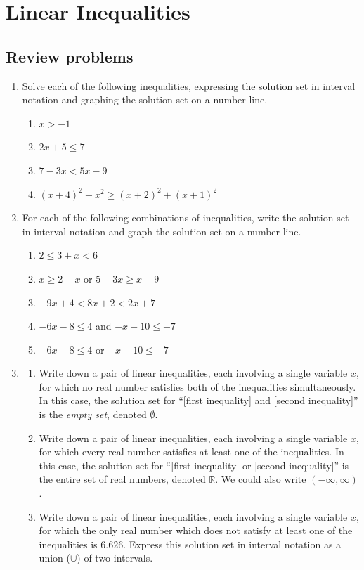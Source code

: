 \section{Linear Inequalities}

\subsection{Review problems}

\begin{enumerate}
\item Solve each of the following inequalities, expressing the solution set in interval notation and graphing the solution set on a number line.
\begin{enumerate}
\item $x > -1$
\item $2x + 5\leq 7$
\item $7 - 3x < 5x - 9$
\item $(x + 4)^2 + x^2\geq (x + 2)^2 + (x + 1)^2$
\end{enumerate}
\item For each of the following combinations of inequalities, write the solution set in interval notation and graph the solution set on a number line.
\begin{enumerate}
\item $2\leq 3 + x < 6$
\item $x\geq 2 - x$ or $5 - 3x\geq x + 9$
\item $-9x + 4 < 8x + 2 < 2x + 7$
\item $-6x - 8\leq 4$ and $-x - 10\leq -7$
\item $-6x - 8\leq 4$ or $-x - 10\leq -7$
\end{enumerate}
\item \begin{enumerate}
\item Write down a pair of linear inequalities, each involving a single variable $x$, for which no real number satisfies both of the inequalities simultaneously. In this case, the solution set for ``[first inequality] and [second inequality]'' is the \emph{empty set}, denoted $\emptyset$.
\item Write down a pair of linear inequalities, each involving a single variable $x$, for which every real number satisfies at least one of the inequalities. In this case, the solution set for ``[first inequality] or [second inequality]'' is the entire set of real numbers, denoted $\mathbb{R}$. We could also write $(-\infty, \infty)$.
\item Write down a pair of linear inequalities, each involving a single variable $x$, for which the only real number which does not satisfy at least one of the inequalities is $6.626$. Express this solution set in interval notation as a union ($\cup$) of two intervals.

\end{enumerate}
\end{enumerate}

